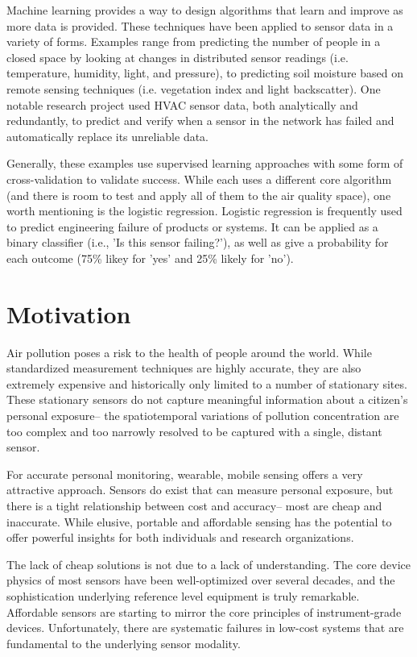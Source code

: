 Machine learning provides a way to design algorithms that learn and improve as more data is provided.  These techniques have been applied to sensor data in a variety of forms.  Examples range from predicting the number of people in a closed space by looking at changes in distributed sensor readings (i.e. temperature, humidity, light, and pressure), to predicting soil moisture based on remote sensing techniques (i.e. vegetation index and light backscatter). \cite{mor2010, ahmad2010}  One notable research project used HVAC sensor data, both analytically and redundantly, to predict and verify when a sensor in the network has failed and automatically replace its unreliable data. \cite{smith2013}

Generally, these examples use supervised learning approaches with some form of cross-validation to validate success.  While each uses a different core algorithm (and there is room to test and apply all of them to the air quality space), one worth mentioning is the logistic regression.  Logistic regression is frequently used to predict engineering failure of products or systems. \cite{logistic}  It can be applied as a binary classifier (i.e., 'Is this sensor failing?'), as well as give a probability for each outcome (75\% likey for 'yes' and  25\% likely for 'no').
  

\section{Motivation}

Air pollution poses a risk to the health of people around the world.  While standardized measurement techniques are highly accurate, they are also extremely expensive and historically only limited to a number of stationary sites.  These stationary sensors do not capture meaningful information about a citizen's personal exposure-- the spatiotemporal variations of pollution concentration are too complex and too narrowly resolved to be captured with a single, distant sensor.

For accurate personal monitoring, wearable, mobile sensing offers a very attractive approach.  Sensors do exist that can measure personal exposure, but there is a tight relationship between cost and accuracy-- most are cheap and inaccurate.  While elusive, portable and affordable sensing has the potential to offer powerful insights for both individuals and research organizations.

The lack of cheap solutions is not due to a lack of understanding.  The core device physics of most sensors have been well-optimized over several decades, and the sophistication underlying reference level equipment is truly remarkable.  Affordable sensors are starting to mirror the core principles of instrument-grade devices.  Unfortunately, there are systematic failures in low-cost systems that are fundamental to the underlying sensor modality.  

